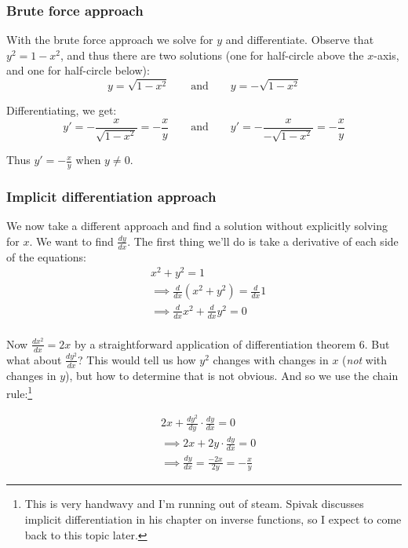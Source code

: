 \subsubsection*{Brute force approach}
With the brute force approach we solve for $y$ and differentiate.
Observe that $y^2=1-x^2$, and thus there are two solutions (one for
half-circle above the $x$-axis, and one for half-circle below):
\[y=\sqrt{1-x^2}\qquad\text{and}\qquad y=-\sqrt{1-x^2}\]

Differentiating, we get:
\[y'=-\frac{x}{\sqrt{1-x^2}}=-\frac{x}{y}\qquad\text{and}\qquad
  y'=-\frac{x}{-\sqrt{1-x^2}}=-\frac{x}{y}\]

Thus $y'=-\frac{x}{y}$ when $y\neq0$.

\subsubsection*{Implicit differentiation approach}
We now take a different approach and find a solution without
explicitly solving for $x$. We want to find $\frac{dy}{dx}$. The first
thing we'll do is take a derivative of each side of the equations:
\begin{align*}
  &x^2+y^2=1\\
  &\implies \frac{d}{dx}(x^2+y^2)=\frac{d}{dx}1\\
  &\implies \frac{d}{dx}x^2+\frac{d}{dx}y^2=0\\
\end{align*}

Now $\frac{dx^2}{dx}=2x$ by a straightforward application of
differentiation theorem 6. But what about $\frac{dy^2}{dx}$? This
would tell us how $y^2$ changes with changes in $x$ (\textit{not} with
changes in $y$), but how to determine that is not obvious. And so we
use the chain rule:\footnote{This is very handwavy and I'm running out
  of steam. Spivak discusses implicit differentiation in his chapter
  on inverse functions, so I expect to come back to this topic later.}

\begin{align*}
  &2x+\frac{dy^2}{dy}\cdot \frac{dy}{dx}=0\\
  &\implies 2x+2y\cdot \frac{dy}{dx}=0\\
  &\implies \frac{dy}{dx}=\frac{-2x}{2y}=-\frac{x}{y}
\end{align*}

